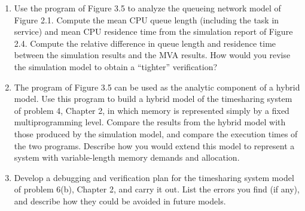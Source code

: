 \begin{enumerate}
\item Use the program of Figure 3.5 to analyze the queueing network model of
Figure 2.1. Compute the mean CPU queue length (including the task in service)
and mean CPU residence time from the simulation report of Figure 2.4. Compute
the relative difference in queue length and residence time between the
simulation results and the MVA results. How would you revise the simulation
model to obtain a ``tighter'' verification?

\item The program of Figure 3.5 can be used as the analytic component of a
hybrid model. Use this program to build a hybrid model of the timesharing
system of problem 4, Chapter 2, in which memory is represented simply by a
\noindent fixed multiprogramming level. Compare the results from the hybrid model with
those produced by the simulation model, and compare the execution times of
the two programs. Describe how you would extend this model to represent a
system with variable-length memory demands and allocation.

\item Develop a debugging and verification plan for the timesharing system
model of problem 6(b), Chapter 2, and carry it out. List the errors you find
(if any), and describe how they could be avoided in future models.
\end{enumerate}
